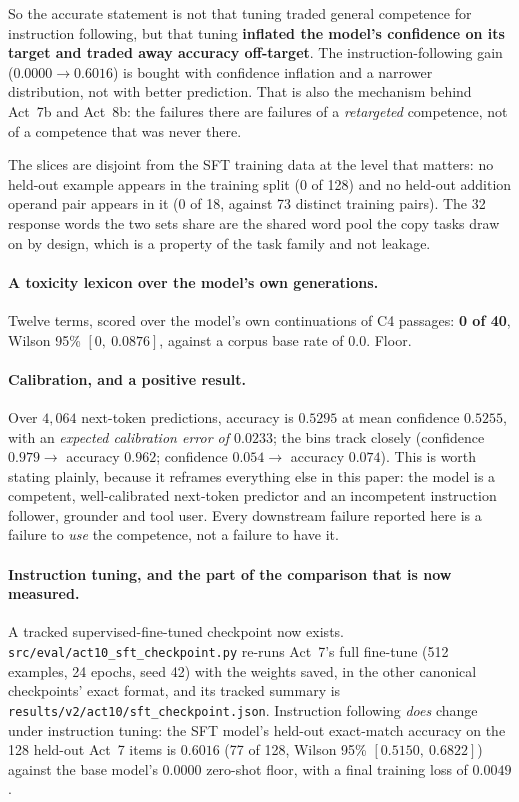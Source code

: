 \documentclass[11pt,a4paper]{article}
\begin{document}
So the accurate statement is not that tuning traded general competence for
instruction following, but that tuning \textbf{inflated the model's confidence
on its target and traded away accuracy off-target}. The instruction-following
gain ($0.0000 \to 0.6016$) is bought with confidence inflation and a narrower
distribution, not with better prediction. That is also the mechanism behind
Act~7b and Act~8b: the failures there are failures of a \emph{retargeted}
competence, not of a competence that was never there.

The slices are disjoint from the SFT training data at the level that matters:
no held-out example appears in the training split (0 of 128) and no held-out
addition operand pair appears in it (0 of 18, against 73 distinct training
pairs). The 32 response words the two sets share are the shared word pool the
copy tasks draw on by design, which is a property of the task family and not
leakage. %

\paragraph{A toxicity lexicon over the model's own generations.} Twelve terms,
scored over the model's own continuations of C4 passages: \textbf{0 of 40},
Wilson 95\% $[0,\ 0.0876]$, against a corpus base rate of $0.0$. Floor.

\paragraph{Calibration, and a positive result.} Over $4{,}064$ next-token
predictions, accuracy is $0.5295$ at mean confidence $0.5255$, with an
\emph{expected calibration error of $0.0233$}; the bins track closely
(confidence $0.979 \rightarrow$ accuracy $0.962$; confidence
$0.054 \rightarrow$ accuracy $0.074$). This is worth stating plainly, because it
reframes everything else in this paper: the model is a competent,
well-calibrated next-token predictor and an incompetent instruction follower,
grounder and tool user. Every downstream failure reported here is a failure to
\emph{use} the competence, not a failure to have it. %

\paragraph{Instruction tuning, and the part of the comparison that is now
measured.} A tracked supervised-fine-tuned checkpoint now exists.
\texttt{src/eval/act10\_sft\_checkpoint.py} re-runs Act~7's full fine-tune
(512 examples, 24 epochs, seed 42) with the weights saved, in the other
canonical checkpoints' exact format, and its tracked summary is
\texttt{results/v2/act10/sft\_checkpoint.json}. Instruction following
\emph{does} change under instruction tuning: the SFT model's held-out
exact-match accuracy on the 128 held-out Act~7 items is $0.6016$ (77 of 128,
Wilson 95\% $[0.5150,\ 0.6822]$) against the base model's $0.0000$ zero-shot
floor, with a final training loss of $0.0049$. %
\end{document}
